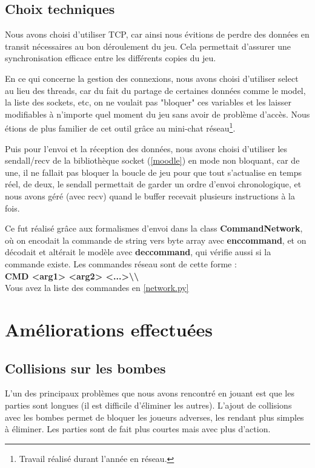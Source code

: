 \documentclass[a4paper]{article}
\begin{document}
\newpage
		\subsection{Choix techniques}
		Nous avons choisi d'utiliser TCP, car ainsi nous évitions de perdre des données en transit nécessaires au bon déroulement du jeu. Cela permettait d'assurer une synchronisation efficace entre les différents copies du jeu.

		En ce qui concerne la gestion des connexions, nous avons choisi d'utiliser select au lieu des threads, car du fait du partage de certaines données comme le model, la liste des sockets, etc, on ne voulait pas "bloquer" ces variables et les laisser modifiables à n'importe quel moment du jeu sans avoir de problème d'accès. Nous étions de plus familier de cet outil grâce au mini-chat réseau\footnote{Travail réalisé durant l'année en réseau.}.

		Puis pour l'envoi et la réception des données, nous avons choisi d'utiliser les sendall/recv de la bibliothèque socket (\ref{moodle}) en mode non bloquant, car de une, il ne fallait pas bloquer la boucle de jeu pour que tout s'actualise en temps réel, de deux, le sendall permettait de garder un ordre d'envoi chronologique, et nous avons géré (avec recv) quand le buffer recevait plusieurs instructions à la fois.

		Ce fut réalisé grâce aux formalismes d'envoi dans la class \textbf{CommandNetwork}, où on encodait la commande de string vers byte array avec \textbf{enc\textunderscore command}, et on décodait et altérait le modèle avec \textbf{dec\textunderscore command}, qui vérifie aussi si la commande existe. Les commandes réseau sont de cette forme :\\
		\textbf{CMD <arg1> <arg2> <...>\textbackslash\textbackslash}
		\\

		Vous avez la liste des commandes en \ref{network.py}

	\section{Améliorations effectuées}
		\subsection{Collisions sur les bombes}
		L'un des principaux problèmes que nous avons rencontré en jouant est que les parties sont longues (il est difficile d'éliminer les autres).
		L'ajout de collisions avec les bombes permet de bloquer les joueurs adverses, les rendant plus simples à éliminer.
		Les parties sont de fait plus courtes mais avec plus d'action.
		\\
\end{document}
